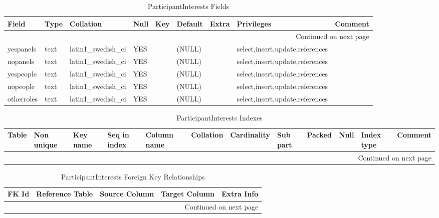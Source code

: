 \documentclass[tablesignature,landscape]{scrartcl}
\begin{document}
\begin{longtable}{|l|l|l|l|l|l|l|l|l|}
\caption{ParticipantInterests Fields} \label{tbl:participantinterestsfields}\\
\hline
 Field       &  Type         &  Collation                &  Null  &  Key  &  Default  &  Extra  &  Privileges                       &  Comment \\
\hline
\endhead
\hline\multicolumn{9}{r}{Continued on next page}\
\endfoot
\endlastfoot
\hline
 badgeid     &  varchar(15)  &  latin1\_{}swedish\_{}ci  &        &  PRI  &           &         &  select,insert,update,references  &           \\
 yespanels   &  text         &  latin1\_{}swedish\_{}ci  &  YES   &       &  (NULL)   &         &  select,insert,update,references  &           \\
 nopanels    &  text         &  latin1\_{}swedish\_{}ci  &  YES   &       &  (NULL)   &         &  select,insert,update,references  &           \\
 yespeople   &  text         &  latin1\_{}swedish\_{}ci  &  YES   &       &  (NULL)   &         &  select,insert,update,references  &           \\
 nopeople    &  text         &  latin1\_{}swedish\_{}ci  &  YES   &       &  (NULL)   &         &  select,insert,update,references  &           \\
 otherroles  &  text         &  latin1\_{}swedish\_{}ci  &  YES   &       &  (NULL)   &         &  select,insert,update,references  &           \\
\hline
\end{longtable}


\begin{longtable}{|l|l|l|l|l|l|l|l|l|l|l|l|}
\caption{ParticipantInterests Indexes} \label{tbl:participantinterestesindexes}\\
\hline
 Table                 &  Non unique  &  Key name  &  Seq in index  &  Column name  &  Collation  &  Cardinality  &  Sub part  &  Packed  &  Null  &  Index type  &  Comment \\
\hline
\endhead
\hline\multicolumn{12}{r}{Continued on next page}\
\endfoot
\endlastfoot
\hline
 ParticipantInterests  &           0  &  PRIMARY   &             1  &  badgeid      &  A          &            1  &  (NULL)    &  (NULL)  &        &  BTREE       &           \\
\hline
\end{longtable}


\begin{longtable}{|l|l|l|l|l|}
\caption{ParticipantInterests Foreign Key Relationships} \label{tbl:participantinterestsfkr}\\
\hline
 FK Id                              &  Reference Table  &  Source Column  &  Target Column  &  Extra Info \\
\hline
\endhead
\hline\multicolumn{5}{r}{Continued on next page}\
\endfoot
\endlastfoot
\hline
 ParticipantInterests\_{}ibfk\_{}1  &  Participants     &  `badgeid`      &  `badgeid`      &              \\
\hline
\end{longtable}
\end{document}
